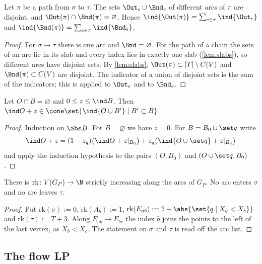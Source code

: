 \begin{lemma}\label{lem:disjoint}
Let $\pi$ be a path from $\sigma$ to $\tau$. The sets $\Out_e\cup\Bnd_e$ of different arcs of $\pi$ are disjoint, and $\Out(\pi)\cap\Bnd(\pi)=\varnothing$. Hence $\ind{\Out(\pi)}=\sum_{e\in\pi}\ind{\Out_e}$ and $\ind{\Bnd(\pi)}=\sum_{e\in\pi}\ind{\Bnd_e}$. \hfill{}
\end{lemma}

\begin{proof}
For $\sigma\to\tau$ there is one arc and $\Bnd=\varnothing$. For the path of a chain the sets of an arc lie in its slab and every index lies in exactly one slab (\cref{lem:slabs}), so different arcs have disjoint sets. By \cref{lem:slabs}, $\Out(\pi)\subset[T]\setminus C(V)$ and $\Bnd(\pi)\subset C(V)$ are disjoint. The indicator of a union of disjoint sets is the sum of the indicators; this is applied to $\Out_e$ and to $\Bnd_e$.
\end{proof}

\begin{lemma}[cube]\label{lem:cube}
Let $O\cap B=\varnothing$ and $0\le z\le\ind B$. Then $\ind O+z\in\cone\set{\ind{O\cup B'}\mid B'\subset B}$. \hfill{}
\end{lemma}

\begin{proof}
Induction on $\abs B$. For $B=\varnothing$ we have $z=0$. For $B=B_0\cup\set q$ write
\[
\ind O+z=(1-z_q)\bigl(\ind O+z|_{B_0}\bigr)+z_q\bigl(\ind{O\cup\set q}+z|_{B_0}\bigr)
\]
and apply the induction hypothesis to the pairs $(O,B_0)$ and $(O\cup\set q,B_0)$.
\end{proof}

\begin{lemma}[acyclicity]\label{lem:rank}
There is $\mathrm{rk}\colon V(G_P)\to\N$ strictly increasing along the arcs of $G_P$. No arc enters $\sigma$ and no arc leaves $\tau$. \hfill{}
\end{lemma}

\begin{proof}
Put $\mathrm{rk}(\sigma):=0$, $\mathrm{rk}(A_b):=1$, $\mathrm{rk}(E_{ab}):=2+\abs{\set{q\mid X_q<X_b}}$ and $\mathrm{rk}(\tau):=T+3$. Along $E_{ab}\to E_{bc}$ the index $b$ joins the points to the left of the last vertex, as $X_b<X_c$. The statement on $\sigma$ and $\tau$ is read off the arc list.
\end{proof}

\subsection{The flow LP}

